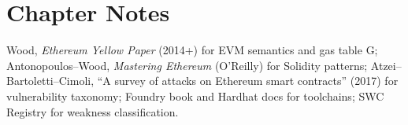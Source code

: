 
\section*{Chapter Notes}
Wood, \emph{Ethereum Yellow Paper} (2014+) for EVM semantics and gas table G; Antonopoulos--Wood, \emph{Mastering Ethereum} (O'Reilly) for Solidity patterns; Atzei--Bartoletti--Cimoli, ``A survey of attacks on Ethereum smart contracts'' (2017) for vulnerability taxonomy; Foundry book and Hardhat docs for toolchains; SWC Registry for weakness classification.
